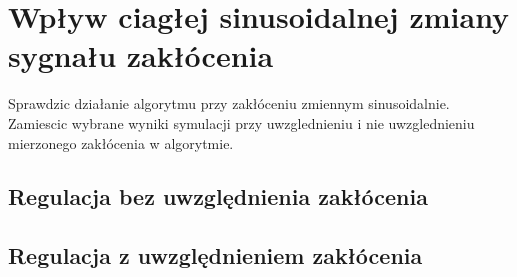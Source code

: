 \section{Wpływ ciagłej sinusoidalnej zmiany sygnału zakłócenia}

Sprawdzic działanie algorytmu przy zakłóceniu zmiennym sinusoidalnie. Zamiescic wybrane
wyniki symulacji przy uwzglednieniu i nie uwzglednieniu mierzonego zakłócenia
w algorytmie.

\subsection{Regulacja bez uwzględnienia zakłócenia}

\subsection{Regulacja z uwzględnieniem zakłócenia}
